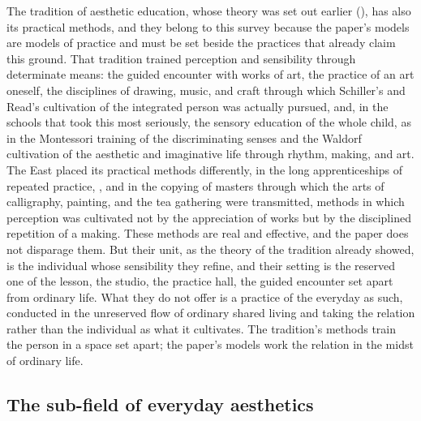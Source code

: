 The tradition of aesthetic education, whose theory was set out earlier (), has also its practical methods, and they belong to this survey because the paper's models are models of practice and must be set beside the practices that already claim this ground. That tradition trained perception and sensibility through determinate means: the guided encounter with works of art, the practice of an art oneself, the disciplines of drawing, music, and craft through which Schiller's and Read's cultivation of the integrated person was actually pursued, and, in the schools that took this most seriously, the sensory education of the whole child, as in the Montessori training of the discriminating senses and the Waldorf cultivation of the aesthetic and imaginative life through rhythm, making, and art. The East placed its practical methods differently, in the long apprenticeships of repeated practice, , and in the copying of masters through which the arts of calligraphy, painting, and the tea gathering were transmitted, methods in which perception was cultivated not by the appreciation of works but by the disciplined repetition of a making. These methods are real and effective, and the paper does not disparage them. But their unit, as the theory of the tradition already showed, is the individual whose sensibility they refine, and their setting is the reserved one of the lesson, the studio, the practice hall, the guided encounter set apart from ordinary life. What they do not offer is a practice of the everyday as such, conducted in the unreserved flow of ordinary shared living and taking the relation rather than the individual as what it cultivates. The tradition's methods train the person in a space set apart; the paper's models work the relation in the midst of ordinary life.

\subsection{The sub-field of everyday aesthetics}
\label{p23:sub:field-everydayaesthetics}

